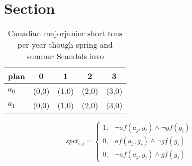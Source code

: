 \documentclass[a4paper]{article}
\begin{document}
\section{Section}

\begin{table}
\begin{adjustbox}{width=0.6\columnwidth}
\begin{tabular}{|l|l|l|l|l|}
\hline
\textbf{plan} & \multicolumn{1}{c|}{\textbf{0}} & \multicolumn{1}{c|}{\textbf{1}} & \multicolumn{1}{c|}{\textbf{2}} & \multicolumn{1}{c|}{\textbf{3}} \\ \hline
\textbf{$a_0$}  & (0,0) & (1,0) & (2,0) & (3,0) \\ \hline
\textbf{$a_1$}  & (0,0) & (1,0) & (2,0) & (3,0) \\ \hline
\end{tabular}
\end{adjustbox}
\caption{Canadian majorjunior short tons per year though spring and summer Scandals invo
}
\end{table}

\begin{equation}
spct_{i,j} =
\begin{cases}
1, & \text{$\neg af(a_j,g_i) \wedge \neg gf(g_i)$}\\
0, & \text{$af(a_j,g_i) \wedge \neg gf(g_i)$}\\
0, & \text{$\neg af(a_j,g_i) \wedge gf(g_i)$}
\end{cases}
\end{equation}
\end{document}
